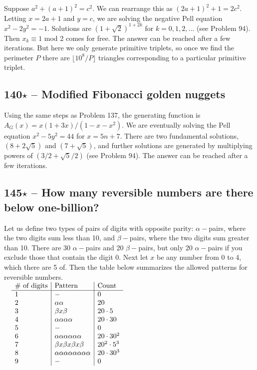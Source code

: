 \documentclass{article}
\begin{document}
Suppose $a^2 + (a+1)^2 = c^2$. 
We can rearrange this as $(2a+1)^2 + 1 = 2c^2$. 
Letting $x = 2a+1$ and $y = c$, we are solving the negative Pell equation $x^2 - 2y^2 = -1$. 
Solutions are $(1+\sqrt{2})^{1+2k}$ for $k = 0, 1, 2, \dotsc$ (see Problem 94). 
Then $x_k \equiv 1$ mod 2 comes for free. 
The answer can be reached after a few iterations. 
But here we only generate primitive triplets, so once we find the perimeter $P$ there are $\lfloor 10^8/P \rfloor$ triangles corresponding to a particular primitive triplet.

\subsection*{140$\star$ -- Modified Fibonacci golden nuggets} 
Using the same steps as Problem 137, the generating function is $A_G(x) = x(1+3x)/(1-x-x^2)$. 
We are eventually solving the Pell equation $x^2 - 5y^2 = 44$ for $x = 5n+7$. 
There are two fundamental solutions, $(8 + 2\sqrt{5})$ and $(7 + \sqrt{5})$, and further solutions are generated by multiplying powers of $(3/2 + \sqrt{5}/2)$ (see Problem 94). 
The answer can be reached after a few iterations.

\subsection*{145$\star$ -- How many reversible numbers are there below one-billion?} 
Let us define two types of pairs of digits with opposite parity: $\alpha-$pairs, where the two digits sum less than 10, and $\beta-$pairs, where the two digits sum greater than 10. 
There are 30 $\alpha-$pairs and 20 $\beta-$pairs, but only 20 $\alpha-$pairs if you exclude those that contain the digit 0. 
Next let $x$ be any number from 0 to 4, which there are 5 of. 
Then the table below summarizes the allowed patterns for reversible numbers. \\

$\quad \begin{array}{l | l | l} \text{\# of digits} & \text{Pattern} & \text{Count} \\ \hline
1 & - & 0 \\
2 & \alpha\alpha & 20 \\
3 & \beta x \beta & 20\cdot 5 \\
4 & \alpha\alpha\alpha\alpha & 20 \cdot 30 \\
5 & - & 0 \\
6 & \alpha\alpha\alpha\alpha\alpha\alpha & 20 \cdot 30^2 \\
7 & \beta x \beta x \beta x \beta & 20^2 \cdot 5^3 \\
8 & \alpha\alpha\alpha\alpha\alpha\alpha\alpha\alpha & 20 \cdot 30^3 \\
9 & - & 0 \end{array}$ \\
\end{document}

